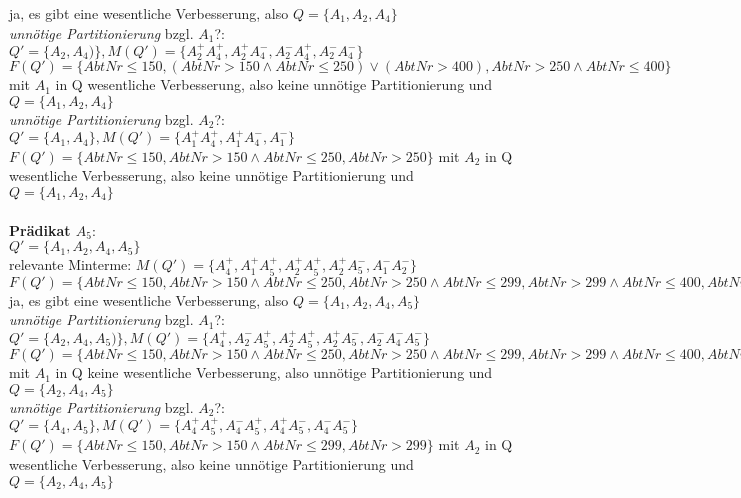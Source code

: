 \documentclass[a4paper]{article}
\begin{document}
ja, es gibt eine wesentliche Verbesserung, also $ Q = \{ A_1, A_2, A_4 \} $ \\
\textit{unnötige Partitionierung} bzgl. $ A_1 $?: \\
$ Q' = \{A_2, A_4) \}, M(Q') = \{ A_2^+ A_4^+, A_2^+ A_4^-, A_2^- A_4^+, A_2^- A_4^- \} $\\
$ F(Q') = \{ AbtNr\leq 150, (AbtNr >150 \wedge AbtNr \leq 250) \vee (AbtNr > 400), AbtNr>250 \wedge AbtNr \leq 400 \} $
mit $ A_1 $ in Q wesentliche Verbesserung, also keine unnötige Partitionierung und $ Q = \{ A_1, A_2, A_4 \} $\\
\textit{unnötige Partitionierung} bzgl. $ A_2 $?: \\
$ Q' = \{A_1, A_4 \}, M(Q') = \{ A_1^+ A_4^+, A_1^+ A_4^-, A_1^-\} $\\
$ F(Q') = \{ AbtNr\leq 150, AbtNr >150 \wedge AbtNr \leq 250, AbtNr >250 \} $
mit $ A_2 $ in Q wesentliche Verbesserung, also keine unnötige Partitionierung und $ Q = \{ A_1, A_2, A_4 \} $\\
\\
\textbf{Prädikat $ A_5 $}:\\
$ Q' = \{ A_1, A_2, A_4, A_5 \} $\\
relevante Minterme: $ M(Q') = \{ A_4^+, A_1^+ A_5^+, A_2^+ A_5^+, A_2^+ A_5^-, A_1^- A_2^- \} $\\
$ F(Q') = \{ AbtNr\leq 150, AbtNr >150 \wedge AbtNr \leq 250, AbtNr>250 \wedge AbtNr \leq 299, AbtNr >299 \wedge AbtNr \leq 400, AbtNr > 400 \} $\\
ja, es gibt eine wesentliche Verbesserung, also $ Q = \{ A_1, A_2, A_4, A_5 \} $ \\
\textit{unnötige Partitionierung} bzgl. $ A_1 $?: \\
$ Q' = \{A_2, A_4, A_5) \}, M(Q') = \{ A_4^+, A_2^- A_5^+, A_2^+ A_5^+, A_2^+ A_5^-, A_2^- A_4^- A_5^- \} $\\
$ F(Q') = \{ AbtNr\leq 150, AbtNr >150 \wedge AbtNr \leq 250, AbtNr>250 \wedge AbtNr \leq 299, AbtNr >299 \wedge AbtNr \leq 400, AbtNr > 400 \} $
mit $ A_1 $ in Q keine wesentliche Verbesserung, also unnötige Partitionierung und $ Q = \{ A_2, A_4, A_5 \} $\\
\textit{unnötige Partitionierung} bzgl. $ A_2 $?: \\
$ Q' = \{A_4, A_5 \}, M(Q') = \{ A_4^+ A_5^+, A_4^- A_5^+, A_4^+ A_5^-, A_4^- A_5^- \} $\\
$ F(Q') = \{ AbtNr\leq 150, AbtNr >150 \wedge AbtNr \leq 299, AbtNr > 299\} $
mit $ A_2 $ in Q wesentliche Verbesserung, also keine unnötige Partitionierung und $ Q = \{ A_2, A_4, A_5 \} $\\
\end{document}
